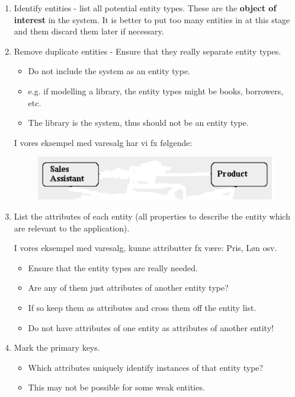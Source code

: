 \begin{enumerate}
	\item Identify entities - list all potential entity types. These are the \textbf{object of interest} in the system. It is better to put too many entities in at this stage and them discard them later if necessary.
	\item Remove duplicate entities - Ensure that they really separate entity types.
	
	\begin{itemize}
		\item Do not include the system as an entity type. \item e.g. if modelling a library, the entity types might be books, borrowers, etc.
		\item The library is the system, thus should not be an entity type.
	\end{itemize}
	
	I vores eksempel med varesalg har vi fx følgende:
	\begin{figure}[H]
		\centering
		\includegraphics[width=0.7\linewidth]{figs/spm1/salesProductEntities.png}
		\caption{}
		\label{fig:salesProductEntities}
	\end{figure}

	
	\item List the attributes of each entity (all properties to describe the entity which are relevant to the application).
	
	I vores eksempel med varesalg, kunne attributter fx være: Pris, Løn osv.
	
	\begin{itemize}
		\item Ensure that the entity types are really needed.
		\item Are any of them just attributes of another entity type?
		\item If so keep them as attributes and cross them off the entity list.
		\item Do not have attributes of one entity as attributes of another entity!
	\end{itemize}
	
	\item Mark the primary keys.
	
	\begin{itemize}
		\item Which attributes uniquely identify instances of that entity type?
		\item This may not be possible for some weak entities.
	\end{itemize}
	

\end{enumerate}

